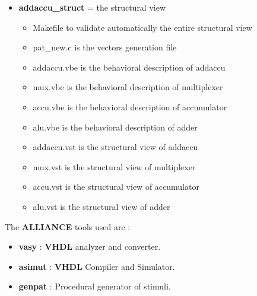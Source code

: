 \documentclass{article}
\begin{document}
{\begin{itemize}
\begin{itemize}
\item Makefile to validate automatically the entire behavioral description
\item addaccu.vbe is the behavioral description of addaccu
\item patterns.pat is the simulation patterns for addaccu
\item addaccu\_dly.vbe is the behavioral description of addaccu with delay
\item patterns\_dly.pat is the simulation patterns for addaccu with delay
\item addaccu4.vhdl is the behavioral description of addaccu using standard VHDL subset
\end{itemize}

\item {\bf addaccu\_struct} = the structural view 

\begin{itemize}
\item Makefile to validate automatically the entire structural view
\item pat\_new.c is the vectors generation file
\item addaccu.vbe is the behavioral description of addaccu
\item mux.vbe is the behavioral description of multiplexer
\item accu.vbe is the behavioral description of accumulator
\item alu.vbe is the behavioral description of adder
\item addaccu.vst is the structural view of addaccu
\item mux.vst is the structural view of multiplexer
\item accu.vst is the structural view of accumulator
\item alu.vst is the structural view of adder
\end{itemize}

\end{itemize}

The {\bf ALLIANCE} tools used are :
\begin{itemize}\itemsep=-.8ex
\item {\bf vasy} : {\bf VHDL} analyzer and converter.
\item {\bf asimut} : {\bf VHDL} Compiler and Simulator.
\item{\bf genpat} :    Procedural generator of stimuli.
\end{itemize}

}
\end{document}
